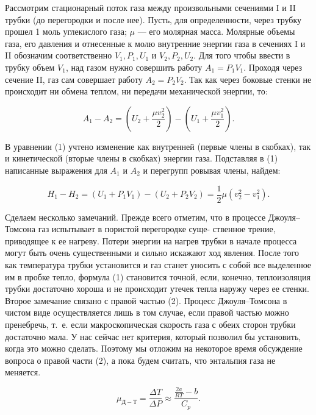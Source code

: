 Рассмотрим стационарный поток газа между произвольными сечениями I и II трубки (до перегородки и после нее). Пусть, для определенности, через трубку прошел 1 моль углекислого газа; $\mu$ --- его молярная масса. Молярные объемы газа, его давления и отнесенные к молю внутренние энергии газа в сечениях I и II обозначим соответственно $V_1, P_1, U_1$ и $V_2, P_2, U_2$. Для того чтобы ввести в трубку объем $V_1$, над газом нужно совершить работу $A_1 = P_1V_1$. Проходя через сечение II, газ сам совершает работу $A_2 = P_2V_2$. Так как через боковые стенки не происходит ни обмена теплом, ни передачи механической энергии, то:

\begin{equation}
A_1 - A_2 = \left(U_2 + \dfrac{\mu v_2^2}{2}\right) - \left(U_1 + \dfrac{\mu v_1^2}{2}\right).
\end{equation}

В уравнении (1) учтено изменение как внутренней (первые члены в скобках), так и кинетической (вторые члены в скобках) энергии газа. Подставляя в (1) написанные выражения для $A_1$ и $A_2$ и перегрупп ровывая члены, найдем:

\begin{equation}
H_1 - H_2 = (U_1 + P_1V_1) - (U_2 + P_2V_2) = \dfrac{1}{2} \mu (v_2^2 - v_1^2).
\end{equation}

Сделаем несколько замечаний. Прежде всего отметим, что в процессе Джоуля–Томсона газ испытывает в пористой перегородке суще- ственное трение, приводящее к ее нагреву. Потери энергии на нагрев трубки в начале процесса могут быть очень существенными и сильно искажают ход явления. После того как температура трубки установится и газ станет уносить с собой все выделенное им в пробке тепло, формула (1) становится точной, если, конечно, теплоизоляция трубки достаточно хороша и не происходит утечек тепла наружу через ее стенки.\\

Второе замечание связано с правой частью (2). Процесс Джоуля–Томсона в чистом виде осуществляется лишь в том случае, если правой частью можно пренебречь, т.~е. если макроскопическая скорость газа с обеих сторон трубки достаточно мала. У нас сейчас нет критерия, который позволил бы установить, когда это можно сделать. Поэтому мы отложим на некоторое время обсуждение вопроса о правой части (2), а пока будем считать, что энтальпия газа не меняется.

\begin{equation}
\mu_{Д-Т} = \dfrac{\Delta T}{\Delta P} \approx \dfrac{\frac{2a}{RT}-b}{C_p}.
\end{equation}

